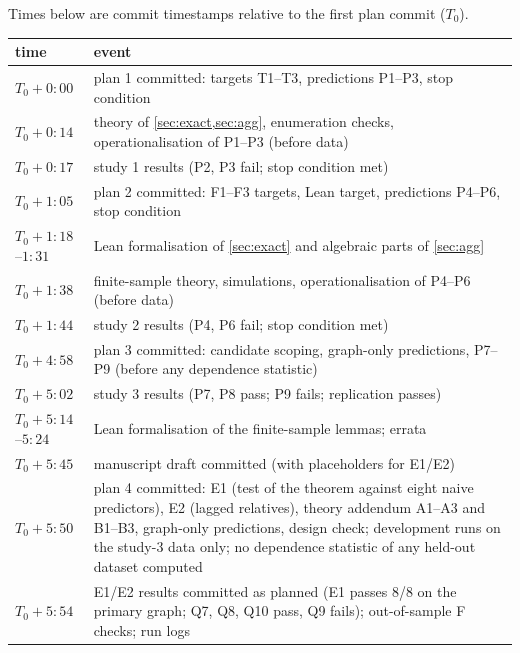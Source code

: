 Times below are commit timestamps relative to the first plan commit ($T_0$).

\begin{center}\small
\begin{tabular}{p{}p{}}
\toprule
time & event \\
\midrule
$T_0+0{:}00$ & plan 1 committed: targets T1--T3, predictions P1--P3, stop condition \\
$T_0+0{:}14$ & theory of \cref{sec:exact,sec:agg}, enumeration checks, operationalisation of P1--P3 (before data) \\
$T_0+0{:}17$ & study 1 results (P2, P3 fail; stop condition met) \\
$T_0+1{:}05$ & plan 2 committed: F1--F3 targets, Lean target, predictions P4--P6, stop condition \\
$T_0+1{:}18$--$1{:}31$ & Lean formalisation of \cref{sec:exact} and algebraic parts of \cref{sec:agg} \\
$T_0+1{:}38$ & finite-sample theory, simulations, operationalisation of P4--P6 (before data) \\
$T_0+1{:}44$ & study 2 results (P4, P6 fail; stop condition met) \\
$T_0+4{:}58$ & plan 3 committed: candidate scoping, graph-only predictions, P7--P9 (before any dependence statistic) \\
$T_0+5{:}02$ & study 3 results (P7, P8 pass; P9 fails; replication passes) \\
$T_0+5{:}14$--$5{:}24$ & Lean formalisation of the finite-sample lemmas; errata \\
$T_0+5{:}45$ & manuscript draft committed (with placeholders for E1/E2) \\
$T_0+5{:}50$ & plan 4 committed: E1 (test of the theorem against eight naive predictors), E2 (lagged relatives), theory addendum A1--A3 and B1--B3, graph-only predictions, design check; development runs on the study-3 data only; no dependence statistic of any held-out dataset computed \\
$T_0+5{:}54$ & E1/E2 results committed as planned (E1 passes 8/8 on the primary graph; Q7, Q8, Q10 pass, Q9 fails); out-of-sample F checks; run logs \\
\bottomrule
\end{tabular}
\end{center}

